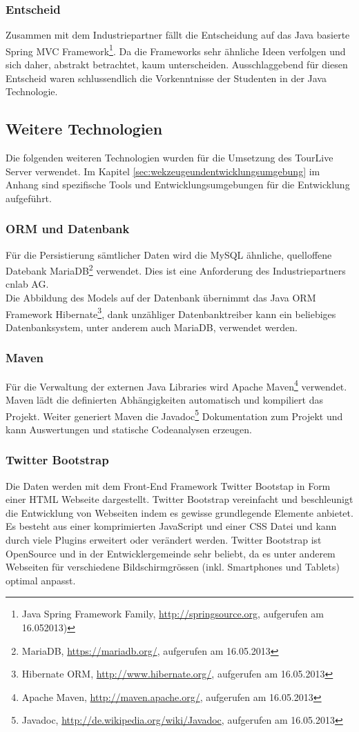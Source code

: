\subsubsection{Entscheid}
Zusammen mit dem Industriepartner fällt die Entscheidung auf das Java basierte Spring MVC Framework\footnote{Java Spring Framework Family, \url{http://springsource.org}, aufgerufen am 16.052013)}. Da die Frameworks sehr ähnliche Ideen verfolgen und sich daher, abstrakt betrachtet, kaum unterscheiden. Ausschlaggebend für diesen Entscheid waren schlussendlich die Vorkenntnisse der Studenten in der Java Technologie. 

\subsection{ Weitere Technologien}
Die folgenden weiteren Technologien wurden für die Umsetzung des TourLive Server verwendet. Im Kapitel \ref{sec:wekzeugeundentwicklungsumgebung} im Anhang sind spezifische Tools und Entwicklungsumgebungen für die Entwicklung aufgeführt.

\subsubsection{ORM und Datenbank}
Für die Persistierung sämtlicher Daten wird die MySQL ähnliche, quelloffene Datebank MariaDB\footnote{MariaDB, \url{https://mariadb.org/}, aufgerufen am 16.05.2013} verwendet. Dies ist eine Anforderung des Industriepartners cnlab AG.
\\
Die Abbildung des Models auf der Datenbank übernimmt das Java ORM Framework Hibernate\footnote{Hibernate ORM, \url{http://www.hibernate.org/}, aufgerufen am 16.05.2013}, dank unzähliger Datenbanktreiber kann ein beliebiges Datenbanksystem, unter anderem auch MariaDB, verwendet werden.

\subsubsection{Maven}
Für die Verwaltung der externen Java Libraries wird Apache Maven\footnote{Apache Maven, \url{http://maven.apache.org/}, aufgerufen am 16.05.2013} verwendet. Maven lädt die definierten Abhängigkeiten automatisch und kompiliert das Projekt. Weiter generiert Maven die Javadoc\footnote{Javadoc, \url{http://de.wikipedia.org/wiki/Javadoc}, aufgerufen am 16.05.2013} Dokumentation zum Projekt und kann Auswertungen und statische Codeanalysen erzeugen.

\subsubsection{Twitter Bootstrap}
Die Daten werden mit dem Front-End Framework Twitter Bootstap in Form einer HTML Webseite dargestellt. Twitter Bootstrap vereinfacht und beschleunigt die Entwicklung von Webseiten  indem es gewisse grundlegende Elemente anbietet. Es besteht aus einer komprimierten JavaScript und einer CSS Datei und kann durch viele Plugins erweitert oder verändert werden. Twitter Bootstrap ist OpenSource und in der Entwicklergemeinde sehr beliebt, da es unter anderem Webseiten für verschiedene Bildschirmgrössen (inkl. Smartphones und Tablets) optimal anpasst.

